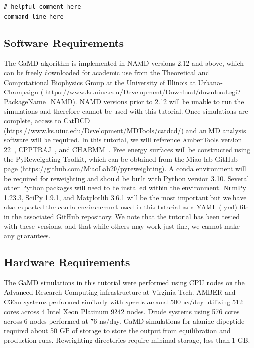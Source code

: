 \documentclass[9pt,tutorial,pubversion]{livecoms}
\begin{document}
\begin{lstlisting}[label=example,caption=example\_code\_box.sh, basicstyle=\small, breaklines=true, backgroundcolor=\color{light-gray}]
# helpful comment here
command line here
\end{lstlisting}

\subsection{Software Requirements} The GaMD algorithm is implemented in NAMD versions 2.12 and above, which can be freely downloaded for academic use from the Theoretical and Computational Biophysics Group at the University of Illinois at Urbana-Champaign ( \url{https://www.ks.uiuc.edu/Development/Download/download.cgi?PackageName=NAMD}). NAMD versions prior to 2.12 will be unable to run the simulations and therefore cannot be used with this tutorial. Once simulations are complete, access to CatDCD (\url{https://www.ks.uiuc.edu/Development/MDTools/catdcd/}) and an MD analysis software will be required. In this tutorial, we will reference AmberTools version 22~\cite{case_ambertools_2023}, CPPTRAJ~\cite{roe_ptraj_2013}, and CHARMM~\cite{hwang_charmm_2024}. Free energy surfaces will be constructed using the PyReweighting Toolkit, which can be obtained from the Miao lab GitHub page (\url{https://github.com/MiaoLab20/pyreweighting}). A conda environment will be required for reweighting and should be built with Python version 3.10. Several other Python packages will need to be installed within the environment. NumPy 1.23.3, SciPy 1.9.1, and Matplotlib 3.6.1 will be the most important but we have also exported the conda environemnet used in this tutorial as a YAML (.yml) file in the associated GitHub repository. We note that the tutorial has been tested with these versions, and that while others may work just fine, we cannot make any guarantees.


\subsection{Hardware Requirements} The GaMD simulations in this tutorial were performed using CPU nodes on the Advanced Research Computing infrastructure at Virginia Tech. AMBER and C36m systems performed similarly with speeds around 500 ns/day utilizing 512 cores across 4 Intel Xeon Platinum 9242 nodes. Drude systems using 576 cores across 6 nodes performed at 76 ns/day. GaMD simulations for alanine dipeptide required about 50 GB of storage to store the output from equilibration and production runs. Reweighting directories require minimal storage, less than 1 GB.
\end{document}
